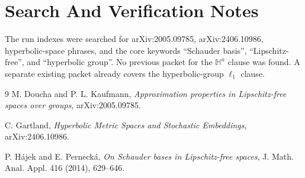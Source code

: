 \documentclass[11pt]{article}
\newcommand{\Hh}{\mathbb{H}}
\begin{document}
\section*{Search And Verification Notes}

The run indexes were searched for arXiv:2005.09785, arXiv:2406.10986,
hyperbolic-space phrases, and the core keywords ``Schauder basis'',
``Lipschitz-free'', and ``hyperbolic group''. No previous packet for the
\(\Hh^n\) clause was found. A separate existing packet already covers the
hyperbolic-group \(\ell_1\) clause.

\begin{thebibliography}{9}
M. Doucha and P. L. Kaufmann,
\emph{Approximation properties in Lipschitz-free spaces over groups},
arXiv:2005.09785.

C. Gartland,
\emph{Hyperbolic Metric Spaces and Stochastic Embeddings},
arXiv:2406.10986.

P. H\'ajek and E. Perneck\'a,
\emph{On Schauder bases in Lipschitz-free spaces},
J. Math. Anal. Appl. 416 (2014), 629--646.
\end{thebibliography}
\end{document}
